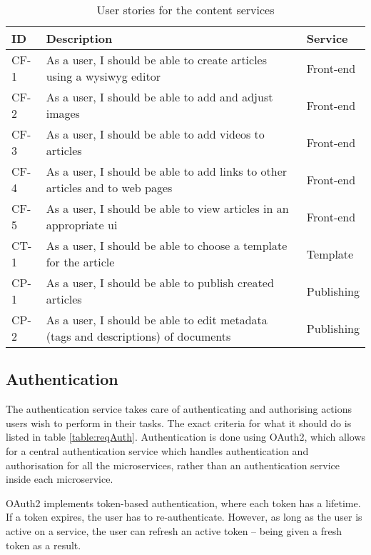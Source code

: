 \begin{table}[H]
   \caption{User stories for the content services}
   \centering
   \label{tab:contentReq}
   \begin{tabular}{|p{1.3cm}|p{9.5cm}|p{4cm}|}\hline%
        ID & Description & Service\\\hline\hline
        
        CF-1 & As a user, I should be able to create articles using a \acrshort{wysiwyg} editor & Front-end \\ \hline
        CF-2 & As a user, I should be able to add and adjust images & Front-end \\ \hline
        CF-3 & As a user, I should be able to add videos to articles & Front-end \\ \hline
        CF-4 & As a user, I should be able to add links to other articles and to web pages & Front-end \\ \hline
        CF-5 & As a user, I should be able to view articles in an appropriate \acrshort{ui} & Front-end \\ \hline
        CT-1 & As a user, I should be able to choose a template for the article & Template \\ \hline
        CP-1 & As a user, I should be able to publish created articles & Publishing \\ \hline
        CP-2 & As a user, I should be able to edit metadata (tags and descriptions) of documents & Publishing \\ \hline
    \end{tabular}
\end{table}

\subsection{Authentication}

The authentication service takes care of authenticating and authorising actions users wish to perform in their tasks. The exact criteria for what it should do is listed in table \ref{table:reqAuth}. Authentication is done using OAuth2, which allows for a central authentication service which handles authentication and authorisation for all the microservices, rather than an authentication service inside each microservice. 

OAuth2 implements token-based authentication, where each token has a lifetime. If a token expires, the user has to re-authenticate. However, as long as the user is active on a service, the user can refresh an active token -- being given a fresh token as a result.

